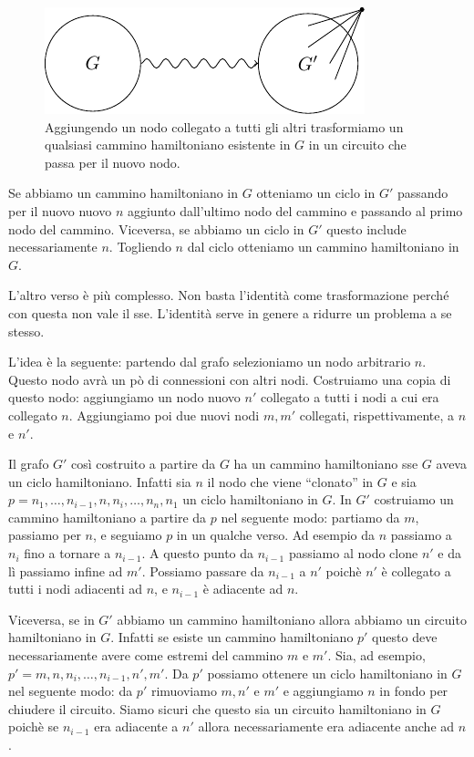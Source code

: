 \begin{figure}[h]
    \begin{center}
        \includegraphics{./img/NPClass/HAMPATHCYCLE.pdf}
        \caption{Aggiungendo un nodo collegato a tutti gli altri trasformiamo un qualsiasi cammino
        hamiltoniano esistente in $G$ in un circuito che passa per il nuovo nodo.}
    \end{center}
\end{figure}

Se abbiamo un cammino hamiltoniano in $G$ otteniamo un ciclo in $G'$ passando per il nuovo nuovo $n$
aggiunto dall'ultimo nodo del cammino e passando al primo nodo del cammino. Viceversa, se abbiamo un
ciclo in $G'$ questo include necessariamente $n$. Togliendo $n$ dal ciclo otteniamo un cammino
hamiltoniano in $G$.

L'altro verso è più complesso. Non basta l'identità come trasformazione perché con questa non
vale il sse. L'identità serve in genere a ridurre un problema a se stesso.

L'idea è la seguente: partendo dal grafo selezioniamo un nodo arbitrario $n$. Questo nodo avrà un
pò di connessioni con altri nodi. Costruiamo una copia di questo nodo: aggiungiamo un nodo nuovo
$n'$ collegato a tutti i nodi a cui era collegato $n$. Aggiungiamo poi due nuovi nodi $m,m'$
collegati, rispettivamente, a $n$ e $n'$.

Il grafo $G'$ così costruito a partire da $G$ ha un cammino hamiltoniano sse $G$ aveva un ciclo
hamiltoniano. Infatti sia $n$ il nodo che viene ``clonato'' in $G$ e sia $p = n_{1}, \dotsc,
n_{i-1}, n, n_{i}, \dotsc, n_{n}, n_{1}$ un ciclo hamiltoniano in $G$. In $G'$ costruiamo un cammino
hamiltoniano a partire da $p$ nel seguente modo: partiamo da $m$, passiamo per $n$, e seguiamo $p$
in un qualche verso. Ad esempio da $n$ passiamo a $n_{i}$ fino a tornare a $n_{i-1}$. A questo punto
da $n_{i-1}$ passiamo al nodo clone $n'$ e da lì passiamo infine ad $m'$. Possiamo passare da
$n_{i-1}$ a $n'$ poichè $n'$ è collegato a tutti i nodi adiacenti ad $n$, e $n_{i-1}$ è adiacente
ad $n$.

Viceversa, se in $G'$ abbiamo un cammino hamiltoniano allora abbiamo un circuito hamiltoniano in
$G$. Infatti se esiste un cammino hamiltoniano $p'$ questo deve necessariamente avere come estremi
del cammino $m$ e $m'$. Sia, ad esempio, $p' = m, n, n_{i},\dotsc, n_{i-1}, n', m'$. Da $p'$
possiamo ottenere un ciclo hamiltoniano in $G$ nel seguente modo: da $p'$ rimuoviamo $m, n'$ e $m'$
e aggiungiamo $n$ in fondo per chiudere il circuito. Siamo sicuri che questo sia un circuito
hamiltoniano in $G$ poichè se $n_{i-1}$ era adiacente a $n'$ allora necessariamente era adiacente
anche ad $n$.

